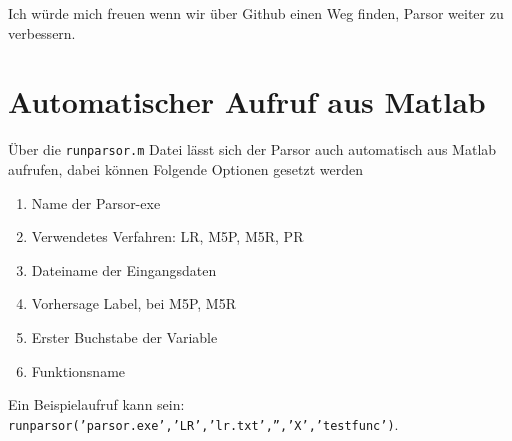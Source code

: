 \documentclass[12pt, a4paper]{scrartcl}
\begin{document}
Ich würde mich freuen wenn wir über Github einen Weg finden, Parsor weiter zu verbessern.

\clearpage
\section{Automatischer Aufruf aus Matlab}

Über die \texttt{runparsor.m} Datei lässt sich der Parsor auch automatisch aus Matlab aufrufen, dabei können Folgende Optionen gesetzt werden

\begin{enumerate}
	\item Name der Parsor-exe
	\item Verwendetes Verfahren: LR, M5P, M5R, PR
	\item Dateiname der Eingangsdaten
	\item Vorhersage Label, bei M5P, M5R 
	\item Erster Buchstabe der Variable
	\item Funktionsname
\end{enumerate}

Ein Beispielaufruf kann sein: \texttt{runparsor('parsor.exe','LR','lr.txt','','X','testfunc')}.

\clearpage
\renewcommand{\refname}{\section{Links}}


\end{document}
